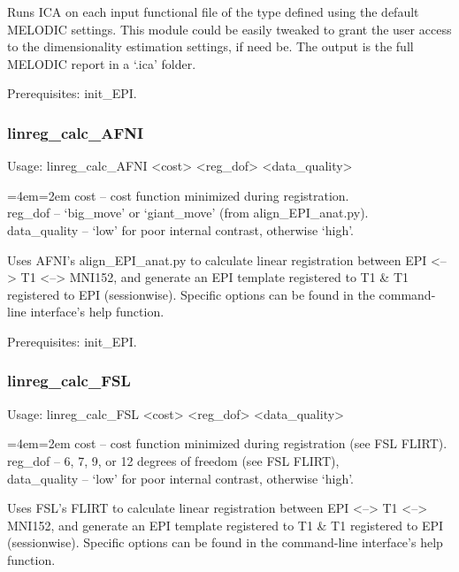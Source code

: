 \documentclass[final,titlepage,letterpaper,oneside,12pt]{article}
\renewcommand{\texttt}[2][BrickRed]{\textcolor{#1}{\ttfamily #2}}%
\newenvironment{blockquote}{%
  \par%
  \medskip
  \leftskip=4em\rightskip=2em%
  \noindent\ignorespaces}{%
  \par\medskip}
\begin{document}
\noindent Runs ICA on each input functional file of the type defined using the default MELODIC settings. This module could be easily tweaked to grant the user access to the dimensionality estimation settings, if need be. The output is the full MELODIC report in a `.ica' folder.

Prerequisites: \texttt{init\_EPI}.

\subsubsection{linreg\_calc\_AFNI}
Usage: \texttt{linreg\_calc\_AFNI <cost> <reg\_dof> <data\_quality>}

\begin{blockquote}
cost -- cost function minimized during registration. \\
reg\_dof -- `big\_move' or `giant\_move' (from align\_EPI\_anat.py). \\
data\_quality -- `low' for poor internal contrast, otherwise `high'. \
\end{blockquote}

\noindent Uses AFNI's align\_EPI\_anat.py to calculate linear registration between EPI <--> T1 <--> MNI152, and generate an EPI template registered to T1 \& T1 registered to EPI (sessionwise). Specific options can be found in the command-line interface's help function.

Prerequisites: \texttt{init\_EPI}.

\subsubsection{linreg\_calc\_FSL}
Usage: \texttt{linreg\_calc\_FSL <cost> <reg\_dof> <data\_quality>}

\begin{blockquote}
cost -- cost function minimized during registration (see FSL FLIRT). \\
reg\_dof -- 6, 7, 9, or 12 degrees of freedom (see FSL FLIRT), \\
data\_quality -- `low' for poor internal contrast, otherwise `high'. \
\end{blockquote}

\noindent Uses FSL's FLIRT to calculate linear registration between EPI <--> T1 <--> MNI152, and generate an EPI template registered to T1 \& T1 registered to EPI (sessionwise). Specific options can be found in the command-line interface's help function.
\end{document}
